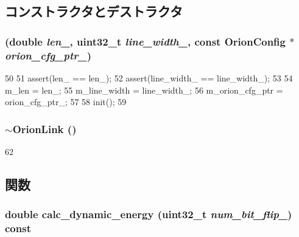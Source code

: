 \subsection{コンストラクタとデストラクタ}
\hypertarget{classOrionLink_a738d02ecde920757987fe6bd52224727}{
\subsubsection[{OrionLink}]{ (double {\em len\_\-}, \/  {\bf uint32\_\-t} {\em line\_\-width\_\-}, \/  const {\bf OrionConfig} $\ast$ {\em orion\_\-cfg\_\-ptr\_\-})}}
\label{classOrionLink_a738d02ecde920757987fe6bd52224727}



\begin{DoxyCode}
50 {
51     assert(len_ == len_);
52     assert(line_width_ == line_width_);
53 
54     m_len = len_;
55     m_line_width = line_width_;
56     m_orion_cfg_ptr = orion_cfg_ptr_;
57 
58     init();
59 }
\end{DoxyCode}
\hypertarget{classOrionLink_a9250d37b77d0ac7ef2389b92d534f00c}{
\subsubsection[{$\sim$OrionLink}]{\setlength{\rightskip}{0pt plus 5cm}$\sim${\bf OrionLink} ()}}
\label{classOrionLink_a9250d37b77d0ac7ef2389b92d534f00c}



\begin{DoxyCode}
62 {}
\end{DoxyCode}


\subsection{関数}
\hypertarget{classOrionLink_a61117a7f4f0cd1bb452941c9d4156db2}{
\subsubsection[{calc\_\-dynamic\_\-energy}]{\setlength{\rightskip}{0pt plus 5cm}double calc\_\-dynamic\_\-energy ({\bf uint32\_\-t} {\em num\_\-bit\_\-flip\_\-}) const}}
\label{classOrionLink_a61117a7f4f0cd1bb452941c9d4156db2}



